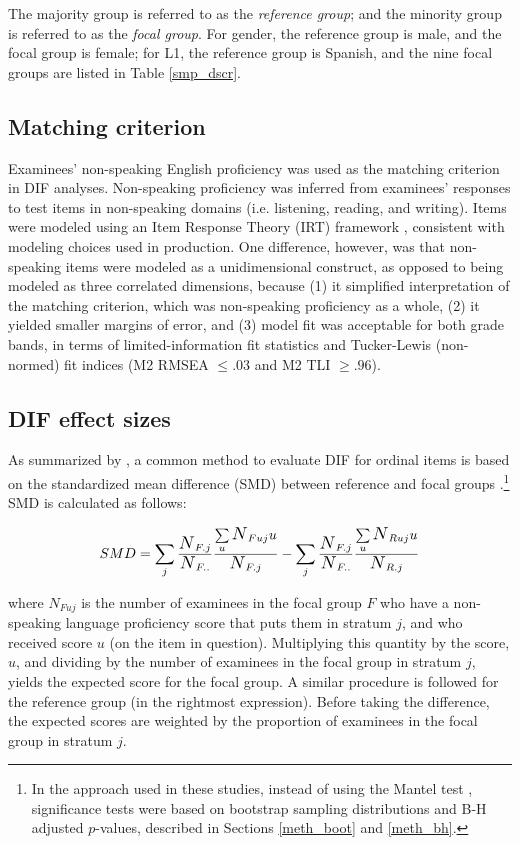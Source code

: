 \documentclass [PhD] {uclathes}
\newcommand{\sbN}{\scalebox{1.25}{$N$}}
\begin{document}
The majority group is referred to as the \emph{reference group}; and the minority group is referred to as the \emph{focal group}. For gender, the reference group is male, and the focal group is female; for L1, the reference group is Spanish, and the nine focal groups are listed in Table \ref{smp_dscr}.

\subsection{Matching criterion}
\label{meth_nonspeaking}

Examinees' non-speaking English proficiency was used as the matching criterion in DIF analyses. Non-speaking proficiency was inferred from examinees' responses to test items in non-speaking domains (i.e. listening, reading, and writing). Items were modeled using an Item Response Theory (IRT) framework \citep{cai_item_2016}, consistent with modeling choices used in production. One difference, however, was that non-speaking items were modeled as a unidimensional construct, as opposed to being modeled as three correlated dimensions, because (1) it simplified interpretation of the matching criterion, which was non-speaking proficiency as a whole, (2) it yielded smaller margins of error, and (3) model fit was acceptable for both grade bands, in terms of limited-information fit statistics and Tucker-Lewis (non-normed) fit indices (M2 RMSEA $\leq .03$ and M2 TLI $\geq .96$). 

\subsection{DIF effect sizes}
\label{meth_fx}

As summarized by \cite{michaelides2008}, a common method to evaluate DIF for ordinal items is based on the standardized mean difference (SMD) between reference and focal groups \citep{dorans1986}.\footnote{In the approach used in these studies, instead of using the Mantel test \citep{mantel1963}, significance tests were based on bootstrap sampling distributions and B-H adjusted $p$-values, described in Sections \ref{meth_boot} and \ref{meth_bh}.} SMD is calculated as follows:

$$
SMD = \sum_j{\frac{\sbN_{F.j}}{\sbN_{F..}}}\frac{\sum\limits_u{\sbN_{Fuj}u}}{\sbN_{F.j}} - \sum_j{\frac{\sbN_{F.j}}{\sbN_{F..}}}\frac{\sum\limits_u{\sbN_{Ruj}u}}{\sbN_{R.j}}
$$

where $N_{Fuj}$ is the number of examinees in the focal group $F$ who have a non-speaking language proficiency score that puts them in stratum $j$, and who received score $u$ (on the item in question). Multiplying this quantity by the score, $u$, and dividing by the number of examinees in the focal group in stratum $j$, yields the expected score for the focal group. A similar procedure is followed for the reference group (in the rightmost expression). Before taking the difference, the expected scores are weighted by the proportion of examinees in the focal group in stratum $j$. 
\end{document}
